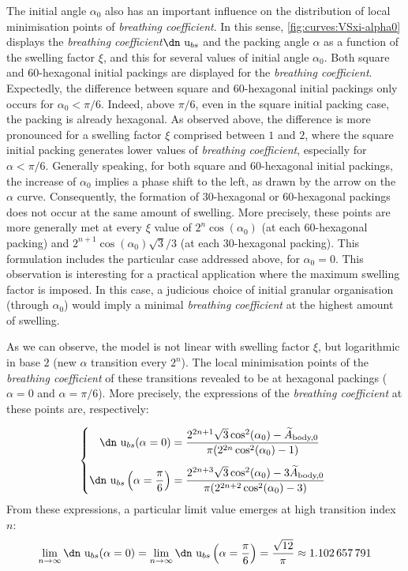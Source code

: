 \documentclass[11pt]{article}
\newcommand{\brco}{\textit{breathing coefficient}\xspace}
\newcommand{\piov}[1]{\pi/#1}
\newcommand{\piovf}[1]{\frac{\pi}{#1}}
\newcommand{\tiAbodyo}{\widetilde{A}_{\text{body,0}}}
\newcommand{\udan}{\text{\dn u}}
\newcommand{\udanbs}{\udan_{bs}}
\newenvironment{alignedatbracket}[1][2]{
	\left\{
	\begin{alignedat}{#1}
	}{
	\end{alignedat}
	\right.\
}
\begin{document}
The initial angle $\alpha_0$ also has an important influence on the distribution
of local minimisation points of \brco. In this sense,
\cref{fig:curves:VSxi-alpha0} displays the \brco $\udanbs$ and the packing angle
$\alpha$ as a function of the swelling factor $\xi$, and this for several values
of initial angle $\alpha_0$. Both square and 60-hexagonal initial packings are
displayed for the \brco. Expectedly, the difference between square and
60-hexagonal initial packings only occurs for $\alpha_0 < \piov{6}$. Indeed,
above $\piov{6}$, even in the square initial packing case, the packing is
already hexagonal. As observed above, the difference is more pronounced for a
swelling factor $\xi$ comprised between $1$ and $2$, where the square initial
packing generates lower values of \brco, especially for $\alpha < \piov{6}$.
Generally speaking, for both square and 60-hexagonal initial packings, the
increase of $\alpha_0$ implies a phase shift to the left, as drawn by the arrow
on the $\alpha$ curve. Consequently, the formation of 30-hexagonal or
60-hexagonal packings does not occur at the same amount of swelling. More
precisely, these points are more generally met at every $\xi$ value of
$2^n\cos(\alpha_0)$ (at each 60-hexagonal packing) and
$2^{n+1}\cos(\alpha_0)\sqrt{3}/3$ (at each 30-hexagonal packing). This
formulation includes the particular case addressed above, for $\alpha_0 = 0$.
This observation is interesting for a practical application where the maximum
swelling factor is imposed. In this case, a judicious choice of initial granular
organisation (through $\alpha_0$) would imply a minimal \brco at the highest
amount of swelling.

As we can observe, the model is not linear with swelling factor $\xi$, but
logarithmic in base $2$ (new $\alpha$ transition every $2^n$). The local
minimisation points of the \brco of these transitions revealed to be at
hexagonal packings ($\alpha = 0$ and $\alpha = \piov{6}$). More precisely, the
expressions of the \brco at these points are, respectively:

\begin{equation}
	\begin{alignedatbracket}[2]
		\udanbs(\alpha = 0) &= \frac
		{2^{2n+1}\sqrt{3}\cos^2(\alpha_0) - \tiAbodyo}
		{\pi(2^{2n}\cos^2(\alpha_0) - 1)} \\[1ex]
		\udanbs\left(\alpha = \piovf{6}\right) &= \frac
		{2^{2n+3}\sqrt{3}\cos^2(\alpha_0) - 3\tiAbodyo}
		{\pi(2^{2n+2}\cos^2(\alpha_0) - 3)} \\
	\end{alignedatbracket}
\end{equation}
From these expressions, a particular limit value emerges at high transition
index $n$:
\begin{equation}
	\lim_{n\to\infty}\udanbs(\alpha = 0)
	= \lim_{n\to\infty}\udanbs\left(\alpha = \piovf{6}\right)
	= \frac{\sqrt{12}}{\pi}
	\approx 1.102\,657\,791
\end{equation}
\end{document}
